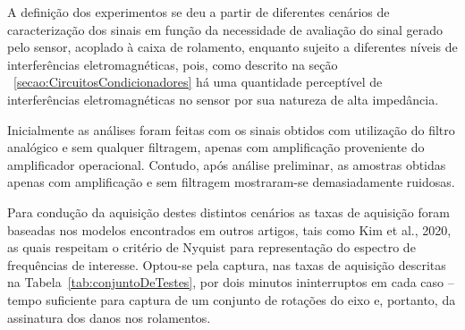 \documentclass[
	12pt,				
	oneside,			
	a4paper,			
	english,			
	brazil,			
	]{abntex2ppgsi}
\begin{document}
A definição dos experimentos se deu a partir de diferentes cenários de caracterização dos sinais em função da necessidade de avaliação do sinal gerado pelo sensor, acoplado à caixa de rolamento, enquanto sujeito a diferentes níveis de interferências eletromagnéticas, pois, como descrito na seção ~\ref{secao:CircuitosCondicionadores} há uma quantidade perceptível de interferências eletromagnéticas no sensor por sua natureza de alta impedância.




Inicialmente as análises foram feitas com os sinais obtidos com utilização do filtro analógico e sem qualquer filtragem, apenas com amplificação proveniente do amplificador operacional. Contudo, após análise preliminar, as amostras obtidas apenas com amplificação e sem filtragem mostraram-se demasiadamente ruidosas. 

Para condução da aquisição destes distintos cenários as taxas de aquisição foram baseadas nos modelos encontrados em outros artigos, tais como Kim et al., 2020, as quais respeitam o critério de Nyquist para representação do espectro de frequências de interesse. Optou-se pela captura, nas taxas de aquisição descritas na Tabela~\ref{tab:conjuntoDeTestes}, por dois minutos ininterruptos em cada caso – tempo suficiente para captura de um conjunto de rotações do eixo e, portanto, da assinatura dos danos nos rolamentos. 
\end{document}
